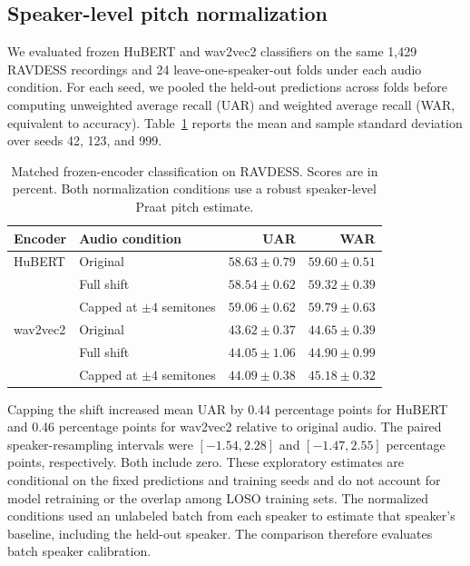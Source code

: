 \subsection{Speaker-level pitch normalization}

We evaluated frozen HuBERT and wav2vec2 classifiers on the same 1,429
RAVDESS recordings and 24 leave-one-speaker-out folds under each audio
condition. For each seed, we pooled the held-out predictions across folds
before computing unweighted average recall (UAR) and weighted average recall
(WAR, equivalent to accuracy). Table~\ref{tab:matched-pitch-results} reports
the mean and sample standard deviation over seeds 42, 123, and 999.

\begin{table}[htbp]
  \centering
  \caption{Matched frozen-encoder classification on RAVDESS. Scores are in
  percent. Both normalization conditions use a robust speaker-level Praat
  pitch estimate.}
  \label{tab:matched-pitch-results}
  \begin{tabular}{llrr}
    \hline
    Encoder & Audio condition & UAR & WAR \\
    \hline
    HuBERT & Original & $58.63 \pm 0.79$ & $59.60 \pm 0.51$ \\
           & Full shift & $58.54 \pm 0.62$ & $59.32 \pm 0.39$ \\
           & Capped at $\pm 4$ semitones & $59.06 \pm 0.62$ & $59.79 \pm 0.63$ \\
    wav2vec2 & Original & $43.62 \pm 0.37$ & $44.65 \pm 0.39$ \\
             & Full shift & $44.05 \pm 1.06$ & $44.90 \pm 0.99$ \\
             & Capped at $\pm 4$ semitones & $44.09 \pm 0.38$ & $45.18 \pm 0.32$ \\
    \hline
  \end{tabular}
\end{table}

Capping the shift increased mean UAR by 0.44 percentage points for HuBERT and
0.46 percentage points for wav2vec2 relative to original audio. The paired
speaker-resampling intervals were $[-1.54, 2.28]$ and $[-1.47, 2.55]$
percentage points, respectively. Both include zero. These exploratory
estimates are conditional on the fixed predictions and training seeds and
do not account for model retraining or the overlap among LOSO training sets.
The normalized conditions used an unlabeled batch from each speaker to
estimate that speaker's baseline, including the held-out speaker. The
comparison therefore evaluates batch speaker calibration.

